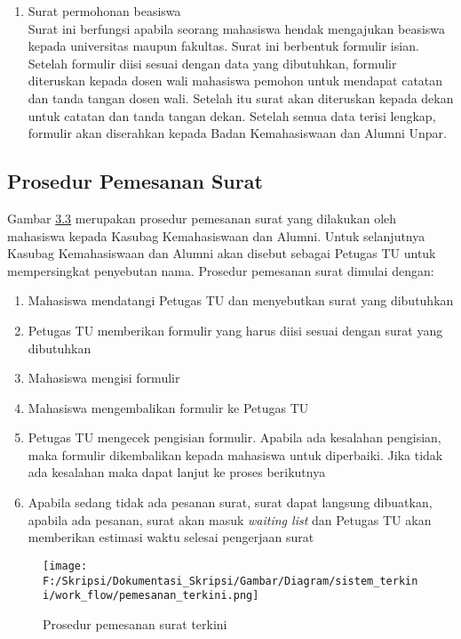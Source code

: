 \begin{enumerate}
	\item Surat permohonan beasiswa \\
	Surat ini berfungsi apabila seorang mahasiswa hendak mengajukan beasiswa kepada universitas maupun fakultas. Surat ini berbentuk formulir isian. Setelah formulir diisi sesuai dengan data yang dibutuhkan, formulir diteruskan kepada dosen wali mahasiswa pemohon untuk mendapat catatan dan tanda tangan dosen wali. Setelah itu surat akan diteruskan kepada dekan untuk catatan dan tanda tangan dekan. Setelah semua data terisi lengkap, formulir akan diserahkan kepada Badan Kemahasiswaan dan Alumni Unpar.
	\end{enumerate}

\subsection{Prosedur Pemesanan Surat}
\label{sec:prosedur_pemesanan_surat}
Gambar \hyperlink{pemesanan_terkini}{3.3} merupakan prosedur pemesanan surat yang dilakukan oleh mahasiswa kepada Kasubag Kemahasiswaan dan Alumni. Untuk selanjutnya Kasubag Kemahasiswaan dan Alumni akan disebut sebagai Petugas TU untuk mempersingkat penyebutan nama. Prosedur pemesanan surat dimulai dengan:
\begin{enumerate}
	\item Mahasiswa mendatangi Petugas TU dan menyebutkan surat yang dibutuhkan
	\item Petugas TU memberikan formulir yang harus diisi sesuai dengan surat yang dibutuhkan
	\item Mahasiswa mengisi formulir
	\item Mahasiswa mengembalikan formulir ke Petugas TU
	\item Petugas TU mengecek pengisian formulir. Apabila ada kesalahan pengisian, maka formulir dikembalikan kepada mahasiswa untuk diperbaiki. Jika tidak ada kesalahan maka dapat lanjut ke proses berikutnya
	\item Apabila sedang tidak ada pesanan surat, surat dapat langsung dibuatkan, apabila ada pesanan, surat akan masuk \textit{waiting list} dan Petugas TU akan memberikan estimasi waktu selesai pengerjaan surat
\end{enumerate}

\begin{figure}[H]
	\centering
		\texttt{[image: F:/Skripsi/Dokumentasi\_Skripsi/Gambar/Diagram/sistem\_terkini/work\_flow/pemesanan\_terkini.png]}
	{\caption{Prosedur pemesanan surat terkini}}
	\label{fig:pemesanan_terkini}
\end{figure}

